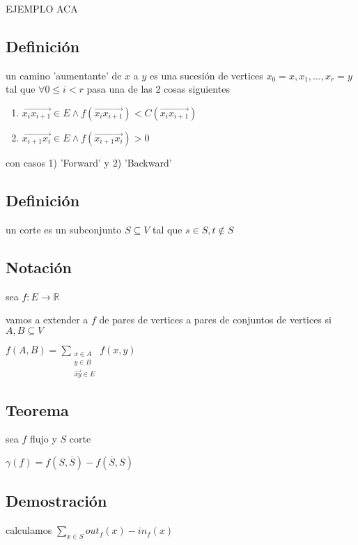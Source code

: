 \documentclass[12pt]{article}
\begin{document}
EJEMPLO ACA

\subsection*{Definición}
un camino 'aumentante' de $x$ a $y$ es una sucesión de vertices $x_0 = x,  x_1, ..., x_r = y$ tal que $\forall 0 \leq i < r$ pasa una de las 2 cosas siguientes

\begin{enumerate}
\item \(\overrightarrow{x_ix_{i+1}} \in E \land f(\overrightarrow{x_ix_{i+1}}) < C(\overrightarrow{x_ix_{i+1}})\)
\item \(\overrightarrow{x_{i+1}x_i} \in E \land f(\overrightarrow{x_{i+1}x_i}) > 0\)
\end{enumerate}

con casos 1) 'Forward'  y 2) 'Backward'

\subsection*{Definición}

un corte es un subconjunto $S \subseteq V$ tal que $s \in S, t \notin S$

\subsection*{Notación}
sea $f: E \rightarrow \mathbb{R}$

vamos a extender a $f$ de pares de vertices a pares de conjuntos de vertices si $A,B \subseteq V$

\(
f(A,B) = \sum_{\substack{x \in A \\ y \in B \\ \overrightarrow{xy} \in E}} f(x, y)
\)

\begin{center}
\section*{Teorema}
sea $f$ flujo y $S$ corte

$\gamma(f) = f(S,\overline{S}) - f(\overline{S}, S)$
\end{center}

\subsection*{Demostración}

calculamos $\sum_{x \in S}out_f(x) - in_f(x)$
\end{document}
